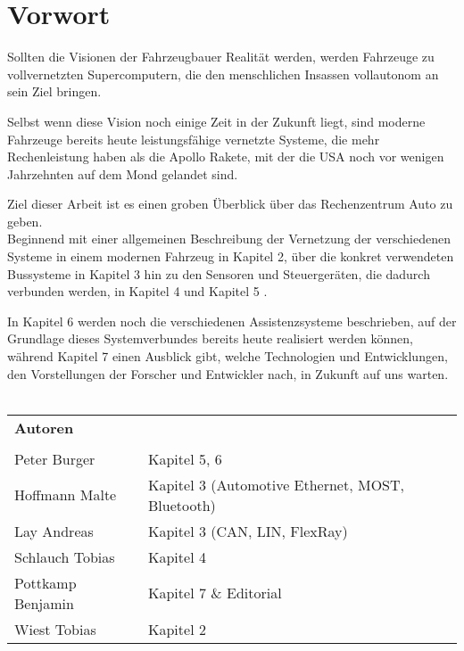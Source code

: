 \section{Vorwort}

Sollten die Visionen der Fahrzeugbauer Realität werden, werden Fahrzeuge zu vollvernetzten Supercomputern, die
den menschlichen Insassen vollautonom an sein Ziel bringen.

Selbst wenn diese Vision noch einige Zeit in der Zukunft liegt, sind moderne Fahrzeuge bereits heute
leistungsfähige vernetzte Systeme, die mehr Rechenleistung haben als die Apollo Rakete, mit der die USA noch
vor wenigen Jahrzehnten auf dem Mond gelandet sind.

Ziel dieser Arbeit ist es einen groben Überblick über das Rechenzentrum Auto zu geben.\\

Beginnend mit einer allgemeinen Beschreibung der Vernetzung der verschiedenen Systeme in einem modernen Fahrzeug 
in Kapitel 2, über die konkret verwendeten Bussysteme in Kapitel 3  hin
zu den Sensoren und Steuergeräten, die dadurch verbunden werden, in Kapitel 4 und Kapitel 5 .

In Kapitel 6 werden noch die verschiedenen Assistenzsysteme beschrieben, auf der Grundlage dieses Systemverbundes bereits heute
realisiert werden können, während Kapitel 7  einen Ausblick gibt, welche Technologien und Entwicklungen, den Vorstellungen
der Forscher und Entwickler nach, in Zukunft auf uns warten.\\\\

\begin{center}
    \begin{tabular}{l l}
        \textbf{Autoren} &\\\\
        Peter Burger & Kapitel 5, 6\\
        Hoffmann Malte & Kapitel 3 (Automotive Ethernet, MOST, Bluetooth)\\
        Lay Andreas & Kapitel 3 (CAN, LIN, FlexRay)\\
        Schlauch Tobias & Kapitel 4\\
        Pottkamp Benjamin & Kapitel 7 \& Editorial\\
        Wiest Tobias & Kapitel 2
    \end{tabular}
\end{center}


